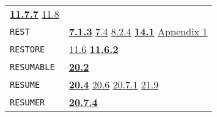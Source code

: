 \documentclass[a4paper]{scrbook}
\begin{document}
\begin{longtable}[]{@{}ll@{}}
\begin{minipage}[t]{0.70\columnwidth}
\textbf{\href{11-input-output.md\#1177-reset}{11.7.7}} \href{11-input-output.md\#118-terminal-channels}{11.8}\strut
\end{minipage}\tabularnewline
\begin{minipage}[t]{0.24\columnwidth}\raggedright\strut
\texttt{REST}\strut
\end{minipage} & \begin{minipage}[t]{0.70\columnwidth}\raggedright\strut
\textbf{\href{07-structured-objects.md\#713-rest-1}{7.1.3}} \href{07-structured-objects.md\#74-examples-1}{7.4}
\href{08-truth.md\#824-object-properties-1}{8.2.4} \textbf{\href{14-data-type-declarations.md\#141-patterns}{14.1}}
\href{appendix-1-a-look-inside.md\#basic-data-structures}{Appendix 1}\strut
\end{minipage}\tabularnewline
\begin{minipage}[t]{0.24\columnwidth}\raggedright\strut
\texttt{RESTORE}\strut
\end{minipage} & \begin{minipage}[t]{0.70\columnwidth}\raggedright\strut
\href{11-input-output.md\#116-save-files}{11.6} \textbf{\href{11-input-output.md\#1162-restore}{11.6.2}}\strut
\end{minipage}\tabularnewline
\begin{minipage}[t]{0.24\columnwidth}\raggedright\strut
\texttt{RESUMABLE}\strut
\end{minipage} & \begin{minipage}[t]{0.70\columnwidth}\raggedright\strut
\textbf{\href{20-coroutines.md\#202-state-of-a-process}{20.2}}\strut
\end{minipage}\tabularnewline
\begin{minipage}[t]{0.24\columnwidth}\raggedright\strut
\texttt{RESUME}\strut
\end{minipage} & \begin{minipage}[t]{0.70\columnwidth}\raggedright\strut
\textbf{\href{20-coroutines.md\#204-resume}{20.4}} \href{20-coroutines.md\#206-example}{20.6}
\href{20-coroutines.md\#2071-break-seq}{20.7.1} \href{21-interrupts.md\#219-user-defined-interrupts}{21.9}\strut
\end{minipage}\tabularnewline
\begin{minipage}[t]{0.24\columnwidth}\raggedright\strut
\texttt{RESUMER}\strut
\end{minipage} & \begin{minipage}[t]{0.70\columnwidth}\raggedright\strut
\textbf{\href{20-coroutines.md\#2074-resumer}{20.7.4}}\strut
\end{minipage}\tabularnewline

\end{longtable}
\end{document}

